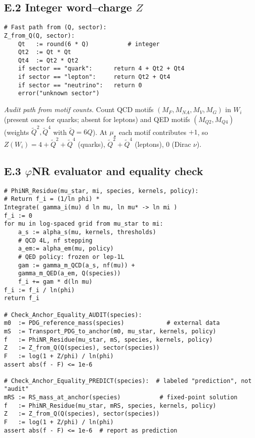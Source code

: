 \documentclass[epjc3]{svjour3}
\begin{document}
\subsection*{E.2 Integer word–charge $Z$}
\begin{verbatim}
# Fast path from (Q, sector):
Z_from_Q(Q, sector):
    Qt   := round(6 * Q)           # integer
    Qt2  := Qt * Qt
    Qt4  := Qt2 * Qt2
    if sector == "quark":      return 4 + Qt2 + Qt4
    if sector == "lepton":     return Qt2 + Qt4
    if sector == "neutrino":   return 0
    error("unknown sector")
\end{verbatim}
\emph{Audit path from motif counts.} Count QCD motifs $(M_F,M_{NA},M_V,M_G)$ in $W_i$ (present once for quarks; absent for leptons) and QED motifs $(M_{Q2},M_{Q4})$ (weights $\tilde Q^2,\tilde Q^4$ with $\tilde Q=6Q$). At $\mu_\star$ each motif contributes $+1$, so $Z(W_i)=4+\tilde Q^2+\tilde Q^4$ (quarks), $\tilde Q^2+\tilde Q^4$ (leptons), $0$ (Dirac $\nu$).

\subsection*{E.3 $\varphi$NR evaluator and equality check}
\begin{verbatim}
# PhiNR_Residue(mu_star, mi, species, kernels, policy):
# Return f_i = (1/ln phi) * 
Integrate( gamma_i(mu) d ln mu, ln mu* -> ln mi )
f_i := 0
for mu in log-spaced grid from mu_star to mi:
    a_s := alpha_s(mu, kernels, thresholds)           
    # QCD 4L, nf stepping
    a_em:= alpha_em(mu, policy)                       
    # QED policy: frozen or lep-1L
    gam := gamma_m_QCD(a_s, nf(mu)) + 
    gamma_m_QED(a_em, Q(species))
    f_i += gam * d(ln mu)
f_i := f_i / ln(phi)
return f_i

# Check_Anchor_Equality_AUDIT(species):
m0  := PDG_reference_mass(species)            # external data
mS  := Transport_PDG_to_anchor(m0, mu_star, kernels, policy)
f   := PhiNR_Residue(mu_star, mS, species, kernels, policy)
Z   := Z_from_Q(Q(species), sector(species))
F   := log(1 + Z/phi) / ln(phi)
assert abs(f - F) <= 1e-6

# Check_Anchor_Equality_PREDICT(species):  # labeled "prediction", not "audit"
mRS := RS_mass_at_anchor(species)           # fixed-point solution
f   := PhiNR_Residue(mu_star, mRS, species, kernels, policy)
Z   := Z_from_Q(Q(species), sector(species))
F   := log(1 + Z/phi) / ln(phi)
assert abs(f - F) <= 1e-6  # report as prediction
\end{verbatim}
\end{document}
